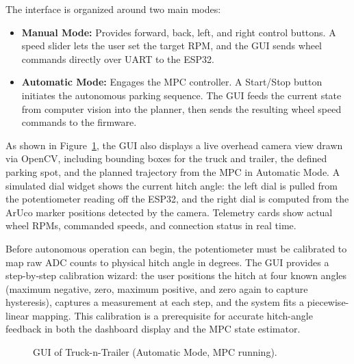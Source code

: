 \documentclass[11pt, letterpaper]{article}
\begin{document}
The interface is organized around two main modes:

\begin{itemize}
  \item \textbf{Manual Mode:} Provides forward, back, left, and right
    control buttons. A speed slider lets the user set the target RPM,
    and the GUI sends wheel commands directly over UART to the ESP32.

  \item \textbf{Automatic Mode:} Engages the MPC controller. A
    Start/Stop button initiates the autonomous parking sequence. The GUI
    feeds the current state from computer vision into the planner, then
    sends the resulting wheel speed commands to the firmware.
\end{itemize}

As shown in Figure~\ref{fig:gui}, the GUI also displays a live overhead
camera view drawn via OpenCV, including bounding boxes for the truck and
trailer, the defined parking spot, and the planned trajectory from the
MPC in Automatic Mode. A simulated dial widget shows the current hitch
angle: the left dial is pulled from the potentiometer reading off the
ESP32, and the right dial is computed from the ArUco marker positions
detected by the camera. Telemetry cards show actual wheel RPMs,
commanded speeds, and connection status in real time.

Before autonomous operation can begin, the potentiometer must be
calibrated to map raw ADC counts to physical hitch angle in degrees. The
GUI provides a step-by-step calibration wizard: the user positions the
hitch at four known angles (maximum negative, zero, maximum positive,
and zero again to capture hysteresis), captures a measurement at each
step, and the system fits a piecewise-linear mapping. This calibration
is a prerequisite for accurate hitch-angle feedback in both the
dashboard display and the MPC state estimator.

\begin{figure}[H]
  \centering
  \caption{GUI of Truck-n-Trailer (Automatic Mode, MPC running).}
  \label{fig:gui}
\end{figure}
\end{document}
